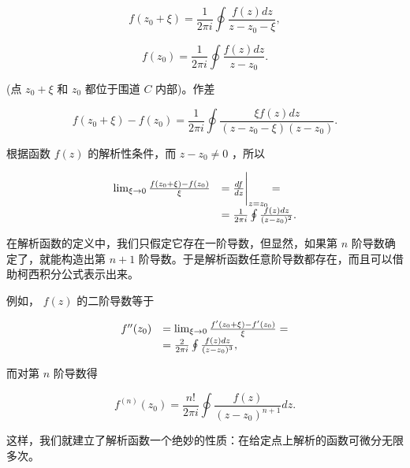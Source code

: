 \begin{equation*}
f (z _ {0} + \xi) = \frac {1}{2 \pi i} \oint \frac {f (z) d z}{z - z _ {0} - \xi},
\end{equation*}

\begin{equation*}
f (z _ {0}) = \frac {1}{2 \pi i} \oint \frac {f (z) d z}{z - z _ {0}}.
\end{equation*}

(点 $z_{0}+\xi$ 和 $z_{0}$ 都位于围道 $C$ 内部)。作差

\begin{equation*}
f \left(z _ {0} + \xi\right) - f \left(z _ {0}\right) = \frac {1}{2 \pi i} \oint \frac {\xi f (z) d z}{\left(z - z _ {0} - \xi\right) \left(z - z _ {0}\right)}.
\end{equation*}

根据函数 $f(z)$ 的解析性条件，而 $z - z_0 \neq 0$ ，所以

\begin{equation*}
\begin{array}{r l}\lim _ {\xi \rightarrow 0} \frac {f (z _ {0} + \xi) - f (z _ {0})}{\xi}&= \frac {d f}{d z} \Bigg | _ {z = z _ {0}} =\\&= \frac {1}{2 \pi i} \oint \frac {f (z) d z}{(z - z _ {0}) ^ {2}}.\end{array}
\end{equation*}

在解析函数的定义中，我们只假定它存在一阶导数，但显然，如果第 $n$ 阶导数确定了，就能构造出第 $n + 1$ 阶导数。于是解析函数任意阶导数都存在，而且可以借助柯西积分公式表示出来。

例如， $f(z)$ 的二阶导数等于

\begin{equation*}
\begin{array}{r l}f ^ {\prime \prime} (z _ {0})&= \lim _ {\xi \rightarrow 0} \frac {f ^ {\prime} (z _ {0} + \xi) - f ^ {\prime} (z _ {0})}{\xi} =\\&= \frac {2}{2 \pi i} \oint \frac {f (z) d z}{(z - z _ {0}) ^ {3}},\end{array}
\end{equation*}

而对第 $n$ 阶导数得

\begin{equation*}
f ^ {(n)} \left(z _ {0}\right) = \frac {n !}{2 \pi i} \oint \frac {f (z)}{\left(z - z _ {0}\right) ^ {n + 1}} d z.
\end{equation*}

这样，我们就建立了解析函数一个绝妙的性质：在给定点上解析的函数可微分无限多次。


